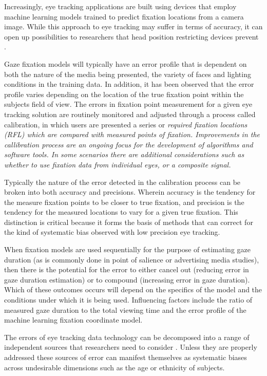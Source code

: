 \documentclass[12pt,a4paper]{article}
\numberwithin{equation}{section}
\begin{document}
Increasingly, eye tracking applications are built using devices that employ 
machine learning models trained to predict fixation locations from a camera image.
While this approach to eye tracking may suffer in terms of accuracy, it can
open up possibilities to researchers that head position restricting devices prevent
\cite{Valtakari2021}.

Gaze fixation models will typically have an error profile that is dependent on both 
the nature of the media being presented, the variety of faces and lighting conditions 
in the training data. In addition, it has been observed that the error profile varies 
depending on the location of the true fixation point within the subjects field of view.
The errors in fixation point measurement for a given eye tracking solution are routinely
monitored and adjusted through a process called calibration, in which users are presented
a series or \it{required fixation locations} (RFL) which are compared with measured 
points of fixation\cite{Hornof2002}. 
Improvements in the callibration process
are an ongoing focus for the development of algorithms\cite{Zhang2014,Hassoumi2019} 
and software tools\cite{ETCAL2018}. In some scenarios there are additional considerations
such as whether to use fixation data from individual eyes, or a composite 
signal\cite{Hooge2019}.

Typically the nature of the error detected in the calibration process can be broken
into both accuracy and precisions. Wherein accuracy is the tendency for the measure
fixation points to be closer to true fixation, and precision is the tendency for the
measured locations to vary for a given true fixation\cite{Holmqvist2022}. This distinction
is critical because it forms the basis of methods that can correct for the kind of 
systematic bias observed with low precision eye tracking.

When fixation models are used sequentially for the purpose of estimating gaze duration
(as is commonly done in point of salience or advertising media studies), 
then there is the potential for the error
to either cancel out (reducing error in gaze duration estimation) or to compound
(increasing error in gaze duration). Which of these outcomes occurs will depend on the
specifics of the model and the conditions under which it is being used.
Influencing factors include the ratio of measured gaze duration to the total viewing time
and the error profile of the machine learning fixation coordinate model.

The errors of eye tracking data technology can be decomposed into a range of
independent sources that researchers need to consider \cite{Holmqvist2012}.
Unless they are properly addressed these sources of error can manifest themselves
as systematic biases across undesirable dimensions such as the age\cite{Dalrymple2018}
or ethnicity of subjects\cite{Blignaut2013}. 
\end{document}
